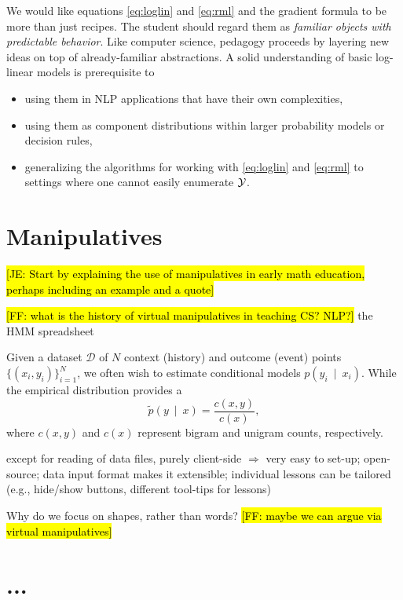 \documentclass[11pt,letterpaper]{article}
\newcommand{\Note}[1]{}
\renewcommand{\Note}[1]{\hl{[#1]}}
\newcommand{\NoteSigned}[3]{{\sethlcolor{#2}\Note{#1: #3}}}
\newcommand{\NoteFF}[1]{\NoteSigned{FF}{LightBlue}{#1}}
\newcommand{\NoteJE}[1]{\NoteSigned{JE}{LightGreen}{#1}}
\newcommand{\empirical}[0]{\ensuremath{\tilde{p}}}
\newcommand{\Data}[0]{\ensuremath{\mathcal{D}}}
\begin{document}
We would like equations \eqref{eq:loglin} and \eqref{eq:rml} and the
gradient formula to be more than just recipes.  The student should
regard them as {\em familiar objects with predictable behavior}.  Like
computer science, pedagogy proceeds by layering new ideas on top of
already-familiar abstractions.  A solid understanding of basic
log-linear models is prerequisite to 
\begin{itemize}
\item using them in NLP applications that have their own complexities, 
\item using them as component distributions within larger probability
  models or decision rules,
\item generalizing the algorithms for working with \eqref{eq:loglin}
  and \eqref{eq:rml} to settings where one cannot easily enumerate
  ${\cal Y}$.
\end{itemize}

\section{Manipulatives}

\NoteJE{Start by explaining the use of manipulatives in early math
  education, perhaps including an example and a quote}

\NoteFF{what is the history of virtual manipulatives in teaching CS? NLP?} the HMM spreadsheet \cite{eisner-2002-tnlp}



Given a dataset \Data{} of $N$ context (history) and outcome (event) points $\{( x_i, y_i)\}_{i=1}^N$, we often wish to  estimate conditional models $p(y_i\ \mid\ x_i)$. While the empirical distribution provides a 
\begin{equation}
\empirical\left(y\ \mid\ x\right) = \frac{c(x,y)}{c(x)},
\label{eqn:empirical_distr}
\end{equation}
where $c(x,y)$ and $c(x)$ represent bigram and unigram counts, respectively.

except for reading of data files, purely client-side $\Rightarrow$ very easy to set-up;
open-source;
data input format makes it extensible;
individual lessons can be tailored (e.g., hide/show buttons, different tool-tips for lessons)

Why do we focus on shapes, rather than words? \NoteFF{maybe we can argue via virtual manipulatives}


\section{...}
\end{document}
